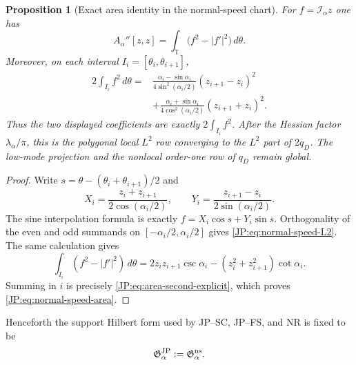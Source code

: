 \documentclass[11pt]{amsart}
\numberwithin{equation}{section}
\newtheorem{proposition}[theorem]{Proposition}
\theoremstyle{definition}
\theoremstyle{remark}
\newcommand{\Gjp}{\mathfrak G^{\rm JP}}
\begin{document}
\begin{proposition}[Exact area identity in the normal-speed chart]
\label{JP:prop:normal-speed-area}
For $f=\mathcal I_\alpha z$ one has
\begin{equation}\label{JP:eq:normal-speed-area}
 \boxed{A_\alpha''[z,z]
 =\int_{\mathbb T}\bigl(f^2-|f'|^2\bigr)\,d\theta.}
\end{equation}
Moreover, on each interval $I_i=[\theta_i,\theta_{i+1}]$,
\begin{equation}\label{JP:eq:normal-speed-L2}
\begin{aligned}
 2\int_{I_i}f^2\,d\theta
 ={}&\frac{\alpha_i-\sin\alpha_i}{4\sin^2(\alpha_i/2)}
       (z_{i+1}-z_i)^2\\
 &+\frac{\alpha_i+\sin\alpha_i}{4\cos^2(\alpha_i/2)}
       (z_{i+1}+z_i)^2.
\end{aligned}
\end{equation}
Thus the two displayed coefficients are exactly $2\int_{I_i}f^2$.  After
the Hessian factor $\lambda_\alpha/\pi$, this is the polygonal local
$L^2$ row converging to the $L^2$ part of $2q_D$.  The low-mode projection
and the nonlocal order-one row of $q_D$ remain global.
\end{proposition}

\begin{proof}
Write $s=\theta-(\theta_i+\theta_{i+1})/2$ and
\[
 X_i=\frac{z_i+z_{i+1}}{2\cos(\alpha_i/2)},
 \qquad
 Y_i=\frac{z_{i+1}-z_i}{2\sin(\alpha_i/2)}.
\]
The sine interpolation formula is exactly
$f=X_i\cos s+Y_i\sin s$.  Orthogonality of the even and odd summands on
$[-\alpha_i/2,\alpha_i/2]$ gives \eqref{JP:eq:normal-speed-L2}.  The same
calculation gives
\[
 \int_{I_i}(f^2-|f'|^2)\,d\theta
 =2z_iz_{i+1}\csc\alpha_i
  -(z_i^2+z_{i+1}^2)\cot\alpha_i.
\]
Summing in $i$ is precisely \eqref{JP:eq:area-second-explicit}, which proves
\eqref{JP:eq:normal-speed-area}.
\end{proof}

Henceforth the support Hilbert form used by JP--SC, JP--FS, and NR is fixed
to be
\begin{equation}\label{JP:eq:JP-metric-fixed}
 \Gjp_\alpha:=\mathfrak G_\alpha^{\rm ns}.
\end{equation}
\end{document}
